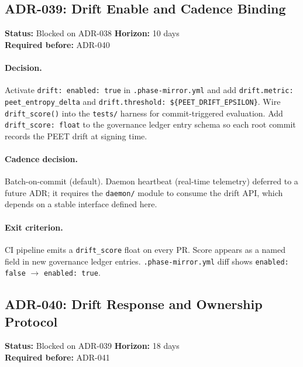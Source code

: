 \documentclass[11pt,letterpaper]{article}
\theoremstyle{definition}
\theoremstyle{remark}
\begin{document}
\subsection{ADR-039: Drift Enable and Cadence Binding}

\begin{mdframed}[linecolor=blue!40,linewidth=1pt,backgroundcolor=blue!2]
\textbf{Status:} Blocked on ADR-038 \quad
\textbf{Horizon:} 10 days \\
\textbf{Required before:} ADR-040
\end{mdframed}

\paragraph{Decision.}
Activate \texttt{drift: enabled: true} in \texttt{.phase-mirror.yml}
and add \texttt{drift.metric: peet\_entropy\_delta} and
\texttt{drift.threshold: \$\{PEET\_DRIFT\_EPSILON\}}.
Wire \texttt{drift\_score()} into the \texttt{tests/} harness
for commit-triggered evaluation. Add \texttt{drift\_score: float}
to the governance ledger entry schema so each root commit records
the PEET drift at signing time.

\paragraph{Cadence decision.}
Batch-on-commit (default). Daemon heartbeat (real-time telemetry)
deferred to a future ADR; it requires the \texttt{daemon/} module
to consume the drift API, which depends on a stable interface
defined here.

\paragraph{Exit criterion.}
CI pipeline emits a \texttt{drift\_score} float on every PR.
Score appears as a named field in new governance ledger entries.
\texttt{.phase-mirror.yml} diff shows \texttt{enabled: false}
\(\to\) \texttt{enabled: true}.

\subsection{ADR-040: Drift Response and Ownership Protocol}

\begin{mdframed}[linecolor=blue!40,linewidth=1pt,backgroundcolor=blue!2]
\textbf{Status:} Blocked on ADR-039 \quad
\textbf{Horizon:} 18 days \\
\textbf{Required before:} ADR-041
\end{mdframed}
\end{document}
